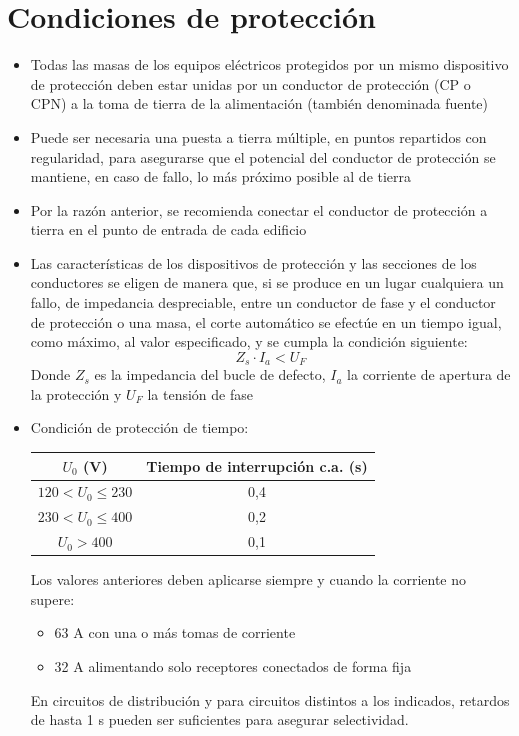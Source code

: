 \section{Condiciones de protección}
\begin{itemize}
	\item Todas las masas de los equipos eléctricos protegidos por un mismo dispositivo de
	protección deben estar unidas por un conductor de protección (CP o CPN) a la toma
	de tierra de la alimentación (también denominada fuente)
	\item Puede ser necesaria una puesta a tierra múltiple, en puntos repartidos con
	regularidad, para asegurarse que el potencial del conductor de protección se
	mantiene, en caso de fallo, lo más próximo posible al de tierra
	\item Por la razón anterior, se recomienda conectar el conductor de protección a tierra en
	el punto de entrada de cada edificio
	\item Las características de los dispositivos de protección y las secciones de los
	conductores se eligen de manera que, si se produce en un lugar cualquiera un fallo,
	de impedancia despreciable, entre un conductor de fase y el conductor de
	protección o una masa, el corte automático se efectúe en un tiempo igual, como
	máximo, al valor especificado, y se cumpla la condición siguiente:
	\begin{equation}
		Z_s\cdot I_a < U_F
	\end{equation}
	Donde $Z_s$ es la impedancia del bucle de defecto, $I_a$ la corriente de apertura de la protección y $U_F$ la tensión de fase
	
	\item  Condición de protección de tiempo:
	\begin{table}[H]
		\centering
		\renewcommand{\arraystretch}{1.5}
		\setlength{\tabcolsep}{8pt}
		\begin{tabular}{|c|c|}
			\hline
			\textbf{$U_0$ (V)} & \textbf{Tiempo de interrupción c.a. (s)} \\ \hline
			$120 < U_0 \leq 230$ & 0,4 \\ \hline
			$230 < U_0 \leq 400$ & 0,2 \\ \hline
			$U_0 > 400$ & 0,1 \\ \hline
		\end{tabular}
		\label{tabla:tiempo_interrupcion}
	\end{table}
	Los valores anteriores deben aplicarse siempre y cuando la corriente no supere:
	\begin{itemize}
		\item 63 A con una o más tomas de corriente
		\item 32 A alimentando solo receptores conectados de forma fija
	\end{itemize}
	En circuitos de distribución y para circuitos distintos a los indicados, retardos de hasta 1 s
	pueden ser suficientes para asegurar selectividad.
\end{itemize}

